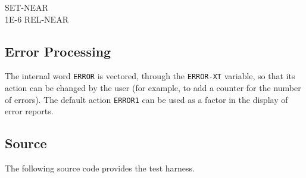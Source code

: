 \begin{tt}
SET-NEAR \\
1E-6 REL-NEAR  \\
\end{tt}

\subsection{Error Processing}

The internal word \texttt{ERROR} is vectored, through the
\texttt{ERROR-XT} variable, so that its action can be changed by
the user (for example, to add a counter for the number of errors).
The default action \texttt{ERROR1} can be used as a factor in the
display of error reports.

\subsection{Source}

The following source code provides the test harness.

